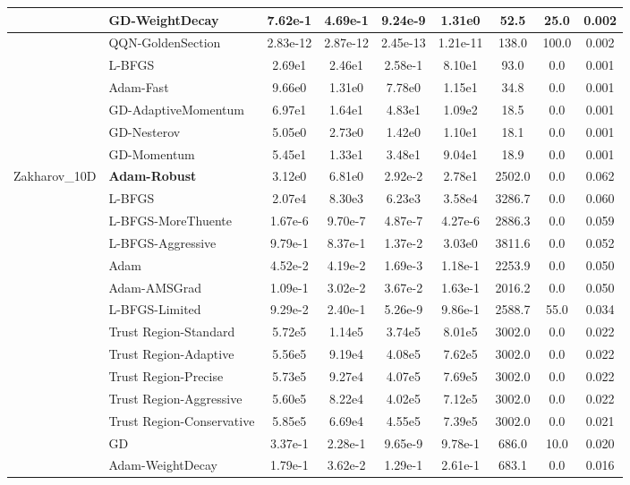 \documentclass[10pt]{article}
\begin{document}
\begin{longtable}{|l|l|c|c|c|c|c|c|c|}
\hline
 & GD-WeightDecay & 7.62e-1 & 4.69e-1 & 9.24e-9 & 1.31e0 & 52.5 & 25.0 & 0.002 \\
\hline
 & QQN-GoldenSection & 2.83e-12 & 2.87e-12 & 2.45e-13 & 1.21e-11 & 138.0 & 100.0 & 0.002 \\
\hline
 & L-BFGS & 2.69e1 & 2.46e1 & 2.58e-1 & 8.10e1 & 93.0 & 0.0 & 0.001 \\
\hline
 & Adam-Fast & 9.66e0 & 1.31e0 & 7.78e0 & 1.15e1 & 34.8 & 0.0 & 0.001 \\
\hline
 & GD-AdaptiveMomentum & 6.97e1 & 1.64e1 & 4.83e1 & 1.09e2 & 18.5 & 0.0 & 0.001 \\
\hline
 & GD-Nesterov & 5.05e0 & 2.73e0 & 1.42e0 & 1.10e1 & 18.1 & 0.0 & 0.001 \\
\hline
 & GD-Momentum & 5.45e1 & 1.33e1 & 3.48e1 & 9.04e1 & 18.9 & 0.0 & 0.001 \\
Zakharov\_10D & \textbf{Adam-Robust} & 3.12e0 & 6.81e0 & 2.92e-2 & 2.78e1 & 2502.0 & 0.0 & 0.062 \\
\hline
 & L-BFGS & 2.07e4 & 8.30e3 & 6.23e3 & 3.58e4 & 3286.7 & 0.0 & 0.060 \\
\hline
 & L-BFGS-MoreThuente & 1.67e-6 & 9.70e-7 & 4.87e-7 & 4.27e-6 & 2886.3 & 0.0 & 0.059 \\
\hline
 & L-BFGS-Aggressive & 9.79e-1 & 8.37e-1 & 1.37e-2 & 3.03e0 & 3811.6 & 0.0 & 0.052 \\
\hline
 & Adam & 4.52e-2 & 4.19e-2 & 1.69e-3 & 1.18e-1 & 2253.9 & 0.0 & 0.050 \\
\hline
 & Adam-AMSGrad & 1.09e-1 & 3.02e-2 & 3.67e-2 & 1.63e-1 & 2016.2 & 0.0 & 0.050 \\
\hline
 & L-BFGS-Limited & 9.29e-2 & 2.40e-1 & 5.26e-9 & 9.86e-1 & 2588.7 & 55.0 & 0.034 \\
\hline
 & Trust Region-Standard & 5.72e5 & 1.14e5 & 3.74e5 & 8.01e5 & 3002.0 & 0.0 & 0.022 \\
\hline
 & Trust Region-Adaptive & 5.56e5 & 9.19e4 & 4.08e5 & 7.62e5 & 3002.0 & 0.0 & 0.022 \\
\hline
 & Trust Region-Precise & 5.73e5 & 9.27e4 & 4.07e5 & 7.69e5 & 3002.0 & 0.0 & 0.022 \\
\hline
 & Trust Region-Aggressive & 5.60e5 & 8.22e4 & 4.02e5 & 7.12e5 & 3002.0 & 0.0 & 0.022 \\
\hline
 & Trust Region-Conservative & 5.85e5 & 6.69e4 & 4.55e5 & 7.39e5 & 3002.0 & 0.0 & 0.021 \\
\hline
 & GD & 3.37e-1 & 2.28e-1 & 9.65e-9 & 9.78e-1 & 686.0 & 10.0 & 0.020 \\
\hline
 & Adam-WeightDecay & 1.79e-1 & 3.62e-2 & 1.29e-1 & 2.61e-1 & 683.1 & 0.0 & 0.016 \\

\end{longtable}
\end{document}
